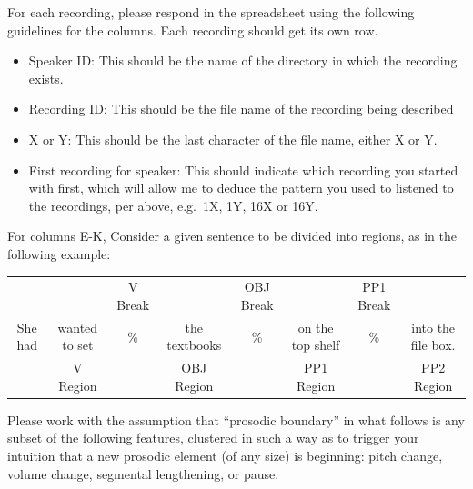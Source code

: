 \documentclass[11pt,oneside]{book}
\providecommand{\tightlist}{%
  \setlength{\itemsep}{0pt}\setlength{\parskip}{0pt}}
\begin{document}
For each recording, please respond in the spreadsheet using the following guidelines for the columns. Each recording should get its own row.

\begin{itemize}
\tightlist
\item
  Speaker ID: This should be the name of the directory in which the recording exists.
\item
  Recording ID: This should be the file name of the recording being described
\item
  X or Y: This should be the last character of the file name, either X or Y.
\item
  First recording for speaker: This should indicate which recording you started with first, which will allow me to deduce the pattern you used to listened to the recordings, per above, e.g.~1X, 1Y, 16X or 16Y.
\end{itemize}

For columns E-K, Consider a given sentence to be divided into regions, as in the following example:

\vspace{2cm}
\begingroup
  \setlength{\tabcolsep}{1pt}
  \begin{tabular}{cccccccc}
    & & \footnotesize V Break & & \footnotesize OBJ Break & & \footnotesize PP1 Break & \\
    She had & wanted to set & \% & the textbooks & \% & on the top shelf & \% & into the file box. \\
    \cmidrule(r){2-2} \cmidrule(r){4-4} \cmidrule(r){6-6} \cmidrule(r){8-8} 
    & \footnotesize V Region & & \footnotesize OBJ Region & & \footnotesize PP1 Region & & PP2 Region \\
  \end{tabular}
\endgroup
\vspace{1cm}

Please work with the assumption that ``prosodic boundary'' in what follows is any subset of the following features, clustered in such a way as to trigger your intuition that a new prosodic element (of any size) is beginning: pitch change, volume change, segmental lengthening, or pause.
\end{document}
